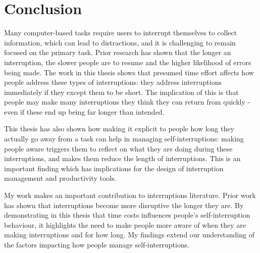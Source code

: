 


\section{Conclusion}
Many computer-based tasks require users to interrupt themselves to collect information, which can lead to distractions, and it is challenging to remain focused on the primary task. Prior research has shown that the longer an interruption, the slower people are to resume and the higher likelihood of errors being made. The work in this thesis shows that presumed time effort affects how people address these types of interruptions: they address interruptions immediately if they except them to be short. The implication of this is that people may make many interruptions they think they can return from quickly - even if these end up being far longer than intended.

This thesis has also shown how making it explicit to people how long they actually go away from a task can help in managing self-interruptions: making people aware triggers them to reflect on what they are doing during these interruptions, and makes them reduce the length of interruptions. This is an important finding which has implications for the design of interruption management and productivity tools. %

My work makes an important contribution to interruptions literature. Prior work has shown that interruptions become more disruptive the longer they are. By demonstrating in this thesis that time costs influences people’s self-interruption behaviour, it highlights the need to make people more aware of when they are making interruptions and for how long. My findings extend our understanding of the factors impacting how people manage self-interruptions. 

